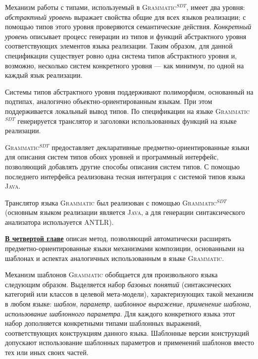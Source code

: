 \documentclass[12pt,a4paper]{article}
\newcommand{\term}[1]{\emph{#1}}
\newcommand{\tool}[1]{\textsc{#1}}
\theoremstyle{definition}
\theoremstyle{plain}
\newcommand{\GRM}{\tool{Grammatic}}
\newcommand{\ATF}{\tool{Grammatic$^{SDT}$}}
\newcommand{\afsubsection}[1]{\par \underline{\textbf{#1}}}
\begin{document}
Механизм работы с типами, используемый в \ATF{}, имеет два уровня: \term{абстрактный уровень} выражает свойства общие для всех языков реализации; с помощью типов этого уровня проверяются семантические действия. \term{Конкретный уровень} описывает процесс генерации из типов и функций абстрактного уровня соответствующих элементов языка реализации. Таким образом, для данной спецификации существует ровно одна система типов абстрактного уровня и, возможно, несколько систем конкретного уровня --- как минимум, по одной на каждый язык реализации.

Системы типов абстрактного уровня поддерживают полиморфизм, основанный на  подтипах, аналогично объектно-ориентированным языкам. При этом поддерживается локальный вывод типов. По спецификации на языке \ATF{} генерируется транслятор и заголовки использованных функций на языке реализации.

\ATF{} предоставляет декларативные предметно-ориентированные языки для описания систем типов обоих уровней и программный интерфейс, позволяющий добавлять другие способы описания систем типов. С помощью последнего интерфейса реализована тесная интеграция с системой типов языка \tool{Java}.

Транслятор языка \GRM{} был реализован с помощью \ATF{} (основным языком реализации является \tool{Java}, а для генерации синтаксического анализатора используется \tool{ANTLR}).

\begin{table}[htbp]
	\centering
\newcommand{\dissonly}[1]{}
	
	\caption{Сравнение \ATF{} с существующими инструментами}\label{AtfTable}
\end{table}

\renewcommand{\thepart}{4}
\afsubsection{В четвертой главе} описан метод, позволяющий автоматически расширять предметно-ориентированные языки механизмами композиции, основанными на шаблонах и аспектах аналогичных использованным в языке \GRM{}. 

Механизм шаблонов \GRM{} обобщается для произвольного языка следующим образом. Выделяется набор \term{базовых понятий} (синтаксических категорий или классов в целевой мета-модели), характеризующих такой механизм в любом языке: \term{шаблон}, \term{параметр}, \term{шаблонное выражение}, \term{применение шаблона}, \term{использование шаблонного параметра}. Для каждого конкретного языка этот набор дополняется конкретными типами шаблонных выражений, соответствующих конструкциям данного языка. Шаблонные версии конструкций допускают использование шаблонных параметров и применений шаблонов вместо тех или иных своих частей. 
\end{document}
